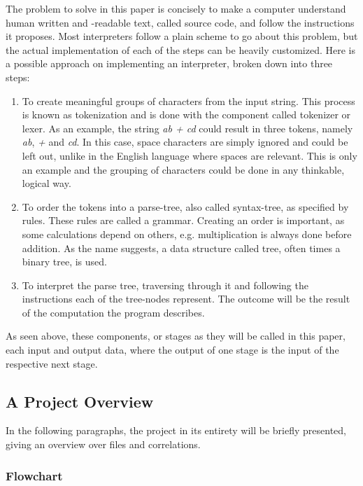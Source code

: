 \documentclass[12pt,a4paper]{article}
\newcommand{\pagelabel}[1]{\phantomsection\label{#1}}
\begin{document}
The problem to solve in this paper is concisely to make a computer understand
human written and -readable text, called source code, and follow the instructions
it proposes.
Most interpreters follow a plain scheme to go about this problem, but the
actual implementation of each of the steps can be heavily customized.
Here is a possible approach on implementing an interpreter, broken
down into three steps:
\begin{enumerate}\pagelabel{simple_interpreter}
    \item To create meaningful groups of characters from the input string. This
        process is known as tokenization and is done with the component called
        tokenizer or lexer. As an example, the string \emph{ab + cd} could result
        in three tokens, namely \emph{ab}, \emph{+} and \emph{cd}. In this case, space characters
        are simply ignored and could be left out, unlike in the English language where spaces are relevant. 
        This is only an example and the grouping of characters could be done 
        in any thinkable, logical way.
    \item To order the tokens into a parse-tree, also called syntax-tree, as
        specified by rules. These rules are called a grammar.
        Creating an order is important, as some calculations depend on others, e.g. multiplication
        is always done before addition. As the name suggests, a data structure
        called tree, often times a binary tree, is used.
    \item To interpret the parse tree, traversing through it and following the
        instructions each of the tree-nodes represent. The outcome
        will be the result of the computation the program describes.
\end{enumerate}

As seen above, these components, or stages as they will be called in this paper,
each input and output data, where the output of one stage is the input of the
respective next stage.

\subsection{A Project Overview}
In the following paragraphs, the project in its entirety will be briefly
presented, giving an overview over files and correlations.

\subsubsection{Flowchart}
\end{document}
